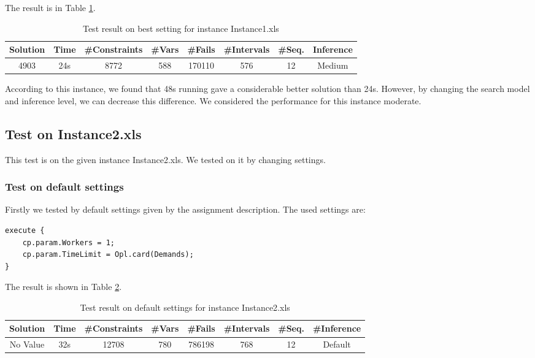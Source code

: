 \documentclass[a4paper, 12pt]{article}
\begin{document}
The result is in Table \ref{best1}. 

\begin{table}
    \centering
    \caption{Test result on best setting for instance Instance1.xls}
    \label{best1}
    \begin{tabular}{|c|c|c|c|c|c|c|c|}
        \hline
        Solution & Time & \#Constraints & \#Vars & \#Fails & \#Intervals & \#Seq. & Inference \\
        \hline
        4903 & 24s & 8772 & 588 & 170110 & 576 & 12 & Medium \\
        \hline
    \end{tabular}
\end{table}

According to this instance, we found that 48s running gave a considerable better solution than 24s. However, by changing the search model and inference level, we can decrease this difference. We considered the performance for this instance moderate.  

\subsection{Test on Instance2.xls}

This test is on the given instance Instance2.xls. We tested on it by changing settings. 

\subsubsection{Test on default settings}

Firstly we tested by default settings given by the assignment description. The used settings are: 

\begin{lstlisting}
execute {
    cp.param.Workers = 1;
    cp.param.TimeLimit = Opl.card(Demands); 
}
\end{lstlisting}

The result is shown in Table \ref{default2}. 

\begin{table}
    \centering
    \caption{Test result on default settings for instance Instance2.xls}
    \label{default2}
    \begin{tabular}{|c|c|c|c|c|c|c|c|}
        \hline
        Solution & Time & \#Constraints & \#Vars & \#Fails & \#Intervals & \#Seq. & \#Inference \\
        \hline
        No Value & 32s & 12708 & 780 & 786198 & 768 & 12 & Default \\
        \hline
    \end{tabular}
\end{table}
\end{document}
